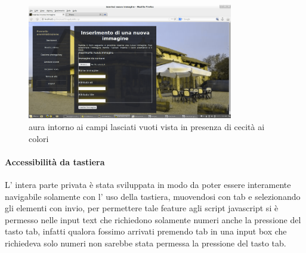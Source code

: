 	\begin{figure}[H]
		\centering \includegraphics[width=0.8\textwidth]{images/color4.png}
		\caption{aura intorno ai campi lasciati vuoti vista in presenza di cecità ai colori}
	\end{figure}
\paragraph{Accessibilità da tastiera}
L' intera parte privata è stata sviluppata in modo da poter essere interamente navigabile solamente con l' uso della tastiera, muovendosi con tab e selezionando gli elementi con invio, per permettere tale feature agli script javascript si è permesso nelle input text che richiedono solamente numeri anche la pressione del tasto tab, infatti qualora fossimo arrivati premendo tab in una input box che richiedeva solo numeri non sarebbe stata permessa la pressione del tasto tab.
